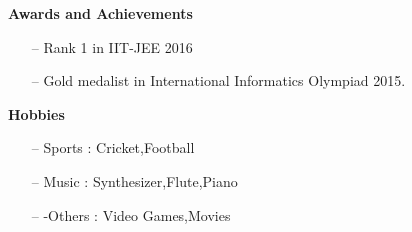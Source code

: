 \documentclass[a4paper, 11pt]{article}
\begin{document}
\textbf{Awards and Achievements}\\
\begin{itemize}
\item[--] Rank 1 in IIT-JEE 2016
\item[--] Gold medalist in International Informatics Olympiad 2015.
\end{itemize}
\textbf{Hobbies}\\
\begin{itemize}
\item[--] Sports   : Cricket,Football
\item[--] Music    : Synthesizer,Flute,Piano
\item[--] -Others  : Video Games,Movies
\end{itemize}
\end{document}
